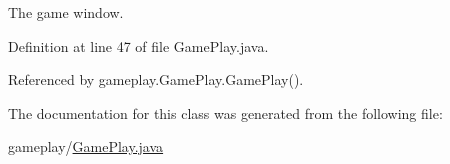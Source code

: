 The game window. 



Definition at line 47 of file Game\-Play.\-java.



Referenced by gameplay.\-Game\-Play.\-Game\-Play().



The documentation for this class was generated from the following file\-:\begin{DoxyCompactItemize}
\item 
gameplay/\hyperlink{a00051}{Game\-Play.\-java}\end{DoxyCompactItemize}
